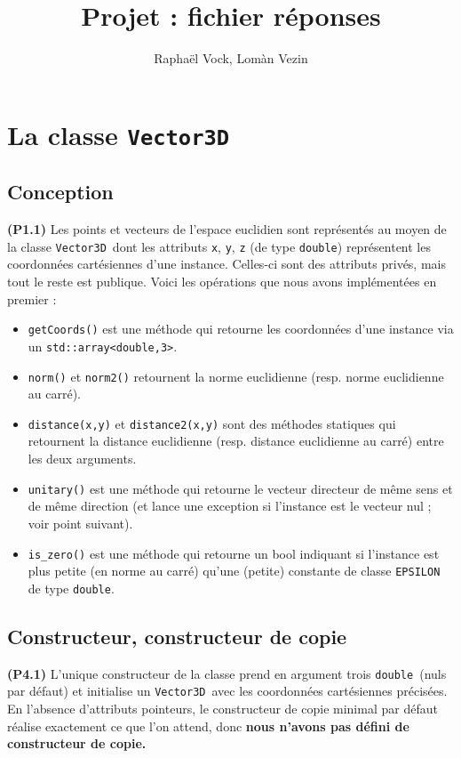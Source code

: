 \documentclass[12pt, letterpaper, twoside]{article}
\title{Projet : fichier réponses}
\author{Raphaël Vock, Lomàn Vezin}
\newcommand{\T}[1]{\texttt{#1}}
\newcommand{\V}[0]{\texttt{Vector3D}}
\newcommand{\double}{\texttt{double}}
\begin{document}
\maketitle
\section{La classe \T{Vector3D}}
\subsection{Conception}
\noindent \textbf{(P1.1)} Les points et vecteurs de l'espace euclidien sont représentés au moyen de la classe \V\ dont les attributs \T{x}, \T{y}, \T{z} (de type \double) représentent les coordonnées cartésiennes d'une instance. Celles-ci sont des attributs privés, mais tout le reste est publique. Voici les opérations que nous avons implémentées en premier :

\begin{itemize}

\item \T{getCoords()}  est une méthode qui retourne les coordonnées d'une instance via un \T{std::array<double,3>}.

\item \T{norm()} et \T{norm2()} retournent la norme euclidienne (resp. norme euclidienne au carré).

\item \T{distance(x,y)} et \T{distance2(x,y)} sont des méthodes statiques qui retournent la distance euclidienne (resp. distance euclidienne au carré) entre les deux arguments.

\item \T{unitary()} est une méthode qui retourne le vecteur directeur de même sens et de même direction (et lance une exception si l'instance est le vecteur nul ; voir point suivant).

\item \T{is\_zero()} est une méthode qui retourne un bool indiquant si l'instance est plus petite (en norme au carré) qu'une (petite) constante de classe \T{EPSILON} de type \double.
\end{itemize}

\subsection{Constructeur, constructeur de copie}
\noindent \textbf{(P4.1)} L'unique constructeur de la classe prend en argument trois \double\ (nuls par défaut) et initialise un \V\ avec les coordonnées cartésiennes précisées. En l'absence d'attributs pointeurs, le constructeur de copie minimal par défaut réalise exactement ce que l'on attend, donc \textbf{nous n'avons pas défini de constructeur de copie.}
\end{document}
